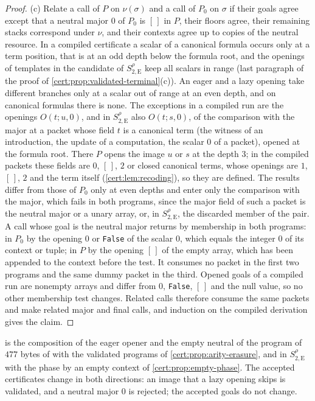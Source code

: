 \begin{proof}
(c) Relate a call of $P$ on $\nu(\sigma)$ and a call of $P_0$ on $\sigma$ if their
goals agree except that a neutral major $0$ of $P_0$ is $[\,]$ in $P$, their floors
agree, their remaining stacks correspond under $\nu$, and their contexts agree up to
copies of the neutral resource. In a compiled certificate a scalar of a canonical
formula occurs only at a term position, that is at an odd depth below the formula
root, and the openings of templates in the candidate of $S^{\rho}_{2,\mathrm E}$ keep
all scalars in range (last paragraph of the proof of
\cref{cert:prop:validated-terminal}(c)). An eager and a lazy opening take different
branches only at a scalar out of range at an even depth, and on canonical formulas
there is none. The exceptions in a compiled run are the openings $O(t;u,0)$, and in
$S^{\rho}_{2,\mathrm E}$ also $O(t;s,0)$, of the comparison with the major at a
packet whose field $t$ is a canonical term (the witness of an introduction, the
update of a computation, the scalar $0$ of a  packet), opened at the
formula root. There $P$ opens the image $u$ or $s$ at the depth $3$; in the compiled
packets these fields are $0$, $[\,]$, $2$ or closed canonical terms, whose openings
are $1$, $[\,]$, $2$ and the term itself (\cref{cert:lem:recoding}), so they are
defined. The results differ from those of $P_0$ only at even depths and enter only
the comparison with the major, which fails in both programs, since the major field
of such a packet is the neutral major or a unary array, or, in
$S^{\rho}_{2,\mathrm E}$, the discarded member of the pair. A call whose goal is the
neutral major returns by membership in both programs: in $P_0$ by the opening $0$ or
\texttt{False} of the scalar $0$, which equals the integer $0$ of its context or
tuple; in $P$ by the opening $[\,]$ of the empty array, which has been appended to
the context before the test. It consumes no packet in the first two programs and the
same dummy packet in the third. Opened goals of a compiled run are nonempty arrays
and differ from $0$, \texttt{False}, $[\,]$ and the null value, so no other membership
test changes. Related calls therefore consume the same packets and make related
major and final calls, and induction on the compiled derivation gives the claim.
\end{proof}

 is the composition of the eager opener and the empty
neutral of the program of $477$ bytes of  with the validated
programs of \cref{cert:prop:arity-erasure}, and in $S^{\rho}_{2,\mathrm E}$ with the
phase by an empty context of \cref{cert:prop:empty-phase}. The accepted certificates
change in both directions: an image that a lazy opening skips is validated, and a
neutral major $0$ is rejected; the accepted goals do not change.

